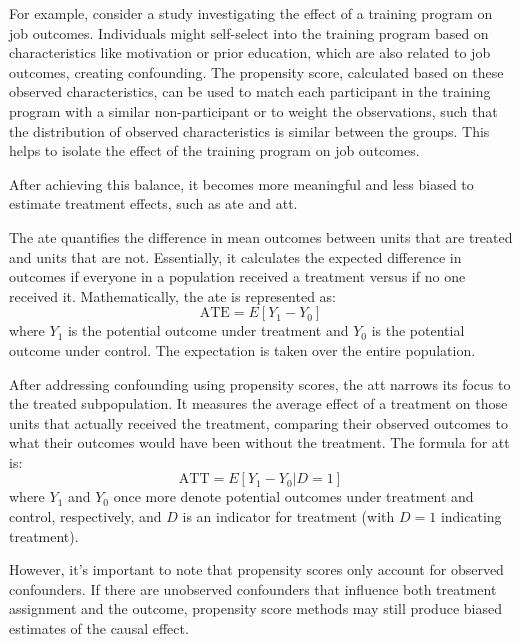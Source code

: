 \begin{enumerate}
    For example, consider a study investigating the effect of a training program on job outcomes. Individuals might self-select into the training program based on characteristics like motivation or prior education, which are also related to job outcomes, creating confounding. The propensity score, calculated based on these observed characteristics, can be used to match each participant in the training program with a similar non-participant or to weight the observations, such that the distribution of observed characteristics is similar between the groups. This helps to isolate the effect of the training program on job outcomes.
    

    After achieving this balance, it becomes more meaningful and less biased to estimate treatment effects, such as \ac{ate} and \ac{att}.

The \ac{ate} quantifies the difference in mean outcomes between units that are treated and units that are not. Essentially, it calculates the expected difference in outcomes if everyone in a population received a treatment versus if no one received it. Mathematically, the \ac{ate} is represented as:
\[ \text{ATE} = E[Y_1 - Y_0] \]
where \( Y_1 \) is the potential outcome under treatment and \( Y_0 \) is the potential outcome under control. The expectation is taken over the entire population.

After addressing confounding using propensity scores, the \ac{att} narrows its focus to the treated subpopulation. It measures the average effect of a treatment on those units that actually received the treatment, comparing their observed outcomes to what their outcomes would have been without the treatment. The formula for \ac{att} is:
\[ \text{ATT} = E[Y_1 - Y_0 | D = 1] \]
where \( Y_1 \) and \( Y_0 \) once more denote potential outcomes under treatment and control, respectively, and \( D \) is an indicator for treatment (with \( D = 1 \) indicating treatment).


    However, it's important to note that propensity scores only account for observed confounders. If there are unobserved confounders that influence both treatment assignment and the outcome, propensity score methods may still produce biased estimates of the causal effect.

\end{enumerate}